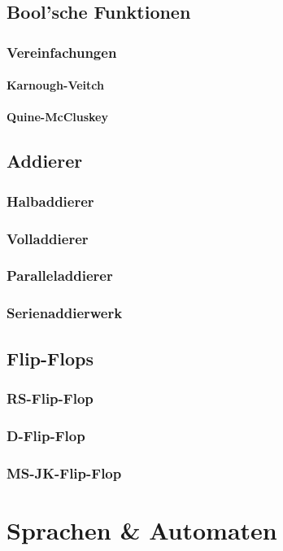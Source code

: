 \documentclass{article}
\begin{document}
\subsection{Bool'sche Funktionen}
\subsubsection{Vereinfachungen}
\paragraph{Karnough-Veitch}
\paragraph{Quine-McCluskey}
\subsection{Addierer}
\subsubsection{Halbaddierer}
\subsubsection{Volladdierer}
\subsubsection{Paralleladdierer}
\subsubsection{Serienaddierwerk}
\subsection{Flip-Flops}
\subsubsection{RS-Flip-Flop}
\subsubsection{D-Flip-Flop}
\subsubsection{MS-JK-Flip-Flop}
\section{Sprachen \& Automaten}
\end{document}
